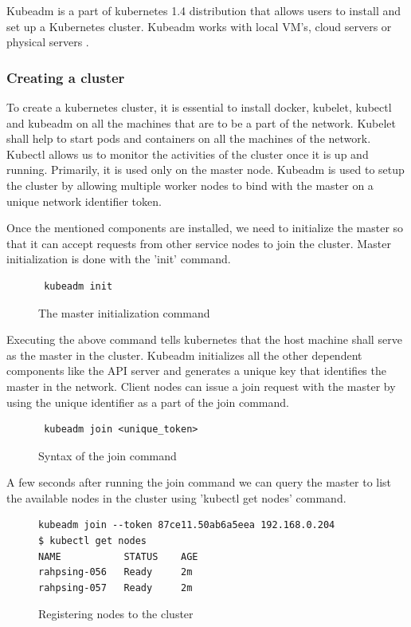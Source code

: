 \documentclass[9pt,twocolumn,twoside]{../../styles/osajnl}
\begin{document}
{Kubeadm is a part of kubernetes 1.4 distribution that allows users to
install and set up a Kubernetes cluster. Kubeadm works with local
VM's, cloud servers or physical servers \cite{www-kubernetes-kubeadm}.

\subsubsection{Creating a cluster}
To create a kubernetes cluster, it is essential to install docker,
kubelet, kubectl and kubeadm on all the machines that are to be a part
of the network. Kubelet shall help to start pods and containers on all
the machines of the network. Kubectl allows us to monitor the
activities of the cluster once it is up and running. Primarily, it is
used only on the master node. Kubeadm is used to setup the cluster by
allowing multiple worker nodes to bind with the master on a unique
network identifier token.

\noindent
Once the mentioned components are installed, we need to initialize the
master so that it can accept requests from other service nodes to join
the cluster. Master initialization is done with the 'init' command.

\begin{figure}[H]
\begin{verbatim}
 kubeadm init
\end{verbatim}
\caption{The master initialization command}
\label{The master initialization command}
\end{figure}

\noindent
Executing the above command tells kubernetes that the host machine
shall serve as the master in the cluster. Kubeadm initializes all the
other dependent components like the API server and generates a unique
key that identifies the master in the network. Client nodes can issue
a join request with the master by using the unique identifier as a
part of the join command.

\begin{figure}[H]
\begin{verbatim}
 kubeadm join <unique_token>
\end{verbatim}
\caption{Syntax of the join command}
\label{Syntax of the join command}
\end{figure}

\noindent
A few seconds after running the join command we can query the master
to list the available nodes in the cluster using 'kubectl get nodes' command.

\begin{figure}[H]
\begin{verbatim}
kubeadm join --token 87ce11.50ab6a5eea 192.168.0.204
$ kubectl get nodes
NAME           STATUS    AGE
rahpsing-056   Ready     2m
rahpsing-057   Ready     2m
\end{verbatim}
\caption{Registering nodes to the cluster}
\label{Registering nodes to the cluster}
\end{figure}

}
\end{document}
